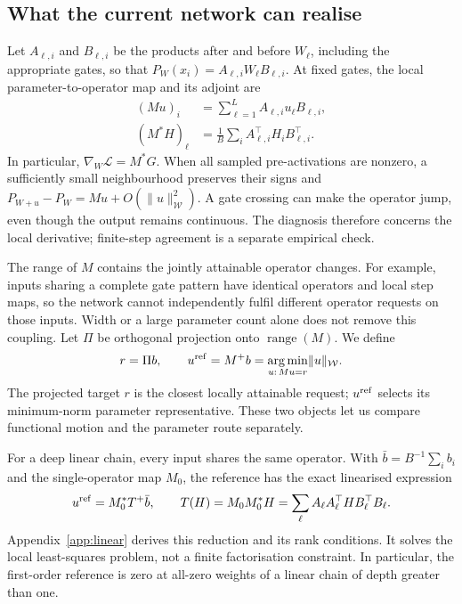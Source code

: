 \documentclass{article}
\DeclareMathOperator{\range}{range}
\theoremstyle{definition}
\theoremstyle{remark}
\begin{document}
\subsection{What the current network can realise}

Let $A_{\ell,i}$ and $B_{\ell,i}$ be the products after and before $W_\ell$, including the appropriate gates, so that $P_W(x_i)=A_{\ell,i}W_\ell B_{\ell,i}$. At fixed gates, the local parameter-to-operator map and its adjoint are
\begin{align}
 (Mu)_i&=\sum_{\ell=1}^L A_{\ell,i}u_\ell B_{\ell,i},\label{eq:stepmap}\\
 (M^*H)_\ell&=\frac1B\sum_i A_{\ell,i}^\top H_iB_{\ell,i}^\top.
 \label{eq:adjoint}
\end{align}
In particular, $\nabla_W\mathcal L=M^*G$. When all sampled pre-activations are nonzero, a sufficiently small neighbourhood preserves their signs and
$P_{W+u}-P_W=Mu+O(\|u\|_{\mathcal W}^2)$. A gate crossing can make the operator jump, even though the output remains continuous. The diagnosis therefore concerns the local derivative; finite-step agreement is a separate empirical check.

The range of $M$ contains the jointly attainable operator changes. For example, inputs sharing a complete gate pattern have identical operators and local step maps, so the network cannot independently fulfil different operator requests on those inputs. Width or a large parameter count alone does not remove this coupling. Let $\Pi$ be orthogonal projection onto $\range(M)$. We define
\begin{equation}
 r=\Pi b,\qquad u^{\rm ref}=M^+b
 =\underset{u:\,Mu=r}{\arg\min}\|u\|_{\mathcal W}.
 \label{eq:reference}
\end{equation}
The projected target $r$ is the closest locally attainable request; $u^{\rm ref}$ selects its minimum-norm parameter representative. These two objects let us compare functional motion and the parameter route separately.

For a deep linear chain, every input shares the same operator. With $\bar b=B^{-1}\sum_i b_i$ and the single-operator map $M_0$, the reference has the exact linearised expression
\begin{equation}
 u^{\rm ref}=M_0^*T^+\bar b,\qquad
 T(H)=M_0M_0^*H=\sum_\ell A_\ell A_\ell^\top H B_\ell^\top B_\ell.
 \label{eq:transfer}
\end{equation}
Appendix~\ref{app:linear} derives this reduction and its rank conditions. It solves the local least-squares problem, not a finite factorisation constraint. In particular, the first-order reference is zero at all-zero weights of a linear chain of depth greater than one.
\end{document}
